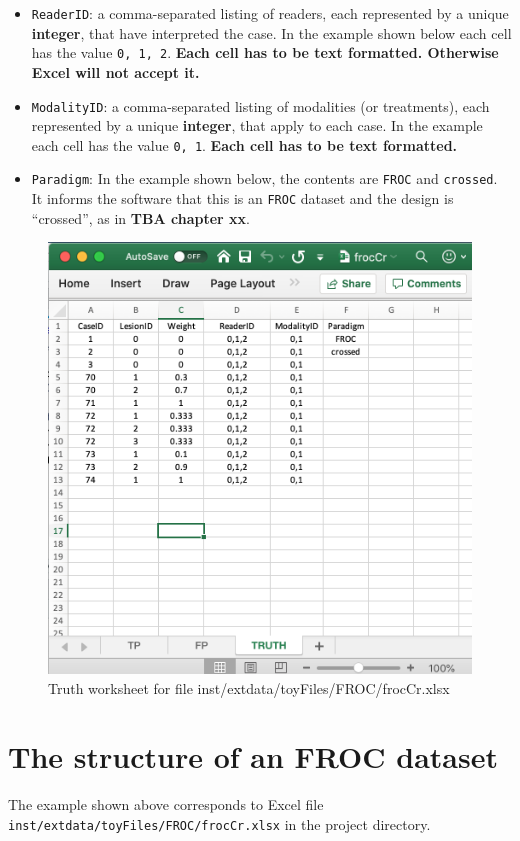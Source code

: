 \documentclass[
]{book}
\begin{document}
\begin{itemize}
\item
  \texttt{ReaderID}: a comma-separated listing of readers, each represented by a unique \textbf{integer}, that have interpreted the case. In the example shown below each cell has the value \texttt{0,\ 1,\ 2}. \textbf{Each cell has to be text formatted. Otherwise Excel will not accept it.}
\item
  \texttt{ModalityID}: a comma-separated listing of modalities (or treatments), each represented by a unique \textbf{integer}, that apply to each case. In the example each cell has the value \texttt{0,\ 1}. \textbf{Each cell has to be text formatted.}
\item
  \texttt{Paradigm}: In the example shown below, the contents are \texttt{FROC} and \texttt{crossed}. It informs the software that this is an \texttt{FROC} dataset and the design is ``crossed'', as in \textbf{TBA chapter xx}.
\end{itemize}

\begin{figure}

{\centering \includegraphics[width=0.5\linewidth,height=0.2\textheight]{images/frocCrTruth} 

}

\caption{Truth worksheet for file inst/extdata/toyFiles/FROC/frocCr.xlsx}\label{fig:frocCrTruth}
\end{figure}

\hypertarget{the-structure-of-an-froc-dataset}{%
\section{The structure of an FROC dataset}\label{the-structure-of-an-froc-dataset}}

The example shown above corresponds to Excel file \texttt{inst/extdata/toyFiles/FROC/frocCr.xlsx} in the project directory.
\end{document}
